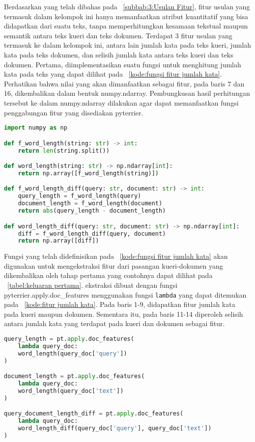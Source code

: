 Berdasarkan yang telah dibahas pada \subbab{}~\ref{subbab:3:Usulan Fitur}, fitur usulan yang termasuk dalam kelompok ini hanya memanfaatkan atribut kuantitatif yang bisa didapatkan dari suatu teks, tanpa memperhitungkan kesamaan tekstual maupun semantik antara teks kueri dan teks dokumen. Terdapat 3 fitur usulan yang termasuk ke dalam kelompok ini, antara lain jumlah kata pada teks kueri, jumlah kata pada teks dokumen, dan selisih jumlah kata antara teks kueri dan teks dokumen. Pertama, diimplementasikan suatu fungsi untuk menghitung jumlah kata pada teks yang dapat dilihat pada \kode{}~\ref{kode:fungsi fitur jumlah kata}. Perhatikan bahwa nilai yang akan dimanfaatkan sebagai fitur, pada baris 7 dan 16, dikembalikan dalam bentuk numpy.ndarray. Pembungkusan hasil perhitungan tersebut ke dalam numpy.ndarray dilakukan agar dapat memanfaatkan fungsi penggabungan fitur yang disediakan pyterrier.


\begin{lstlisting}[language=Python, caption={Fungsi fitur jumlah kata}, label={kode:fungsi fitur jumlah kata}]
import numpy as np

def f_word_length(string: str) -> int:
    return len(string.split())

def word_length(string: str) -> np.ndarray[int]:
    return np.array([f_word_length(string)])

def f_word_length_diff(query: str, document: str) -> int:
    query_length = f_word_length(query)
    document_length = f_word_length(document)
    return abs(query_length - document_length)

def word_length_diff(query: str, document: str) -> np.ndarray[int]:
    diff = f_word_length_diff(query, document)
    return np.array([diff])
\end{lstlisting}

Fungsi yang telah didefinisikan pada \kode{}~\ref{kode:fungsi fitur jumlah kata} akan digunakan untuk mengekstraksi fitur dari pasangan kueri-dokumen yang dikembalikan oleh tahap \ranking{} pertama yang contohnya dapat dilihat pada \tabel{}~\ref{tabel:keluaran pertama}. \Pipeline{} ekstraksi dibuat dengan fungsi pyterrier.apply.doc\_features menggunakan fungsi \lstinline{lambda} yang dapat ditemukan pada \kode{}~\ref{kode:fitur jumlah kata}. Pada baris 1-9, didapatkan fitur jumlah kata pada kueri maupun dokumen. Sementara itu, pada baris 11-14 diperoleh selisih antara jumlah kata yang terdapat pada kueri dan dokumen sebagai fitur.
\begin{lstlisting}[language=Python, caption={\Pipeline{} ekstraksi fitur jumlah kata}, label={kode:fitur jumlah kata}]
query_length = pt.apply.doc_features(
    lambda query_doc:
    word_length(query_doc['query'])
)

document_length = pt.apply.doc_features(
    lambda query_doc:
    word_length(query_doc['text'])
)

query_document_length_diff = pt.apply.doc_features(
    lambda query_doc:
    word_length_diff(query_doc['query'], query_doc['text'])
)
\end{lstlisting}








